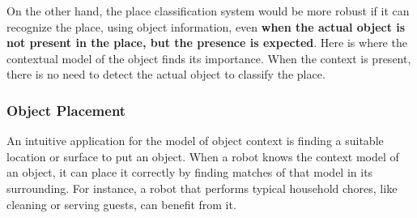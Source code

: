On the other hand, the place classification system would be more robust if it can recognize the place, using object information, 
even {\bf when the actual object is not present in the place, but the presence is expected}.
Here is where the contextual model of the object finds its importance. When the context is present, there is no need to detect the actual 
object to classify the place.

 
 
 \subsubsection*{Object Placement} 
 
 An intuitive application for the model of object context is finding a suitable location or surface to put an object.
 When a robot knows the context model of an object, it can place it correctly by finding matches of that model in its 
 surrounding.
 For instance, a robot that performs typical household chores, like cleaning or serving guests, can benefit from it.  
 



